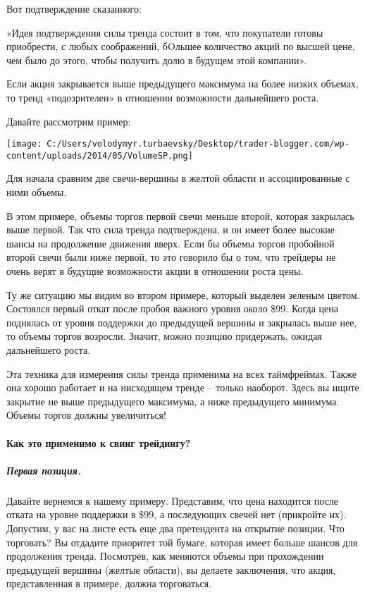 \documentclass[a5paper]{article}
\begin{document}
Вот подтверждение сказанного:

«Идея подтверждения силы тренда состоит в том, что покупатели готовы приобрести, с любых соображений, бOльшее количество акций по высшей цене, чем было до этого, чтобы получить долю в будущем этой компании».

Если акция закрывается выше предыдущего максимума на более низких объемах, то тренд «подозрителен» в отношении возможности дальнейшего роста.

Давайте рассмотрим пример:

\texttt{[image: C:/Users/volodymyr.turbaevsky/Desktop/trader-blogger.com/wp-content/uploads/2014/05/VolumeSP.png]}

Для начала сравним две свечи-вершины в желтой области и ассоциированные с ними объемы.

В этом примере, объемы торгов первой свечи меньше второй, которая закрылась выше первой. Так что сила тренда подтверждена, и он имеет более высокие шансы на продолжение движения вверх. Если бы объемы торгов пробойной второй свечи были ниже первой, то это говорило бы о том, что трейдеры не очень верят в будущие возможности акции в отношении роста цены.

Ту же ситуацию мы видим во втором примере, который выделен зеленым цветом. Состоялся первый откат после пробоя важного уровня около \$99. Когда цена поднялась от уровня поддержки до предыдущей вершины и закрылась выше нее, то объемы торгов возросли. Значит, можно позицию придержать, ожидая дальнейшего роста.

Эта техника для измерения силы тренда применима на всех
таймфреймах. Также она хорошо работает и на нисходящем тренде – только
наоборот. Здесь вы ищите закрытие не выше предыдущего максимума, а
ниже предыдущего минимума. Объемы торгов должны увеличиться!

\paragraph{Как это применимо к свинг трейдингу?}

\subparagraph{Первая позиция.} Давайте вернемся к нашему примеру. Представим, что цена находится после отката на уровне поддержки в \$99, а последующих свечей нет (прикройте их). Допустим, у вас на листе есть еще два претендента на открытие позиции. Что торговать? Вы отдадите приоритет той бумаге, которая имеет больше шансов для продолжения тренда. Посмотрев, как меняются объемы при прохождении предыдущей вершины (желтые области), вы делаете заключения, что акция, представленная в примере, должна торговаться.
\end{document}
